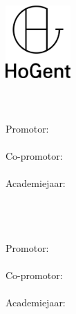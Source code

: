 \begin{titlepage}
	
	\begin{center}
		\begingroup
			\rmfamily
			\includegraphics[width=2.5cm]{img/HG-beeldmerk-woordmerk}\\[.5cm]
			\faculteit\\[3cm]
			\titel
			\vfill
			\student\\[3.5cm]
			\rapporttype\\[2cm]
			Promotor:\\ \promotor\\
			Co-promotor:\\ \copromotor\\[2.5cm]
			Academiejaar: \academiejaar\\[.5cm]
			\examenperiode
		\endgroup
	\end{center}
	
	\restoregeometry
\end{titlepage}

\emptypage

\begin{titlepage}
	
	\begin{center}
		\begingroup
			\rmfamily
			\faculteit\\[3cm]
			\titel
			\vfill
			\student\\[3.5cm]
			\rapporttype\\[2cm]
			Promotor:\\ \promotor\\
			Co-promotor:\\ \copromotor\\[2.5cm]
			Academiejaar: \academiejaar\\[.5cm]
			\examenperiode
		\endgroup
	\end{center}
	
	\restoregeometry
\end{titlepage}
